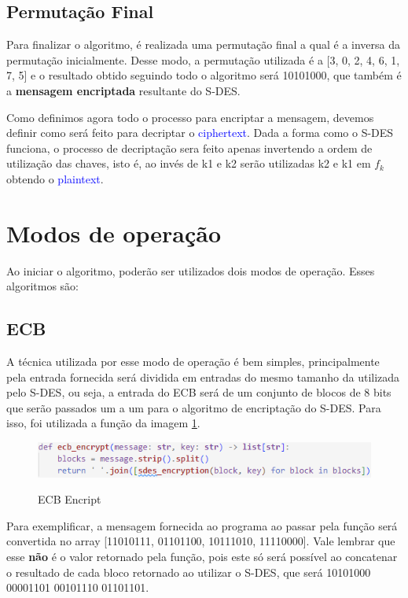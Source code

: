 \documentclass[12pt]{article}
\newcommand{\blue}[1]{\textcolor{blue}{#1}}
\begin{document}
\newpage
\subsection{Permutação Final}

Para finalizar o algoritmo, é realizada uma permutação final a qual é a inversa da permutação inicialmente. Desse modo, a permutação utilizada é a [3, 0, 2, 4, 6, 1, 7, 5] e o resultado obtido seguindo todo o algoritmo será 10101000, que também é a \textbf{mensagem encriptada} resultante do S-DES.

Como definimos agora todo o processo para encriptar a mensagem, devemos definir como será feito para decriptar o \blue{ciphertext}. Dada a forma como o S-DES funciona, o processo de decriptação sera feito apenas invertendo a ordem de utilização das chaves, isto é, ao invés de k1 e k2 serão utilizadas k2 e k1 em $f_{k}$ obtendo o \blue{plaintext}. 
\newpage

\section{Modos de operação}
Ao iniciar o algoritmo, poderão ser utilizados dois modos de operação. Esses algoritmos são:

\subsection{ECB}
A técnica utilizada por esse modo de operação é bem simples, principalmente pela entrada fornecida será dividida em entradas do mesmo tamanho da utilizada pelo S-DES, ou seja, a entrada do ECB será de um conjunto de blocos de 8 bits que serão passados um a um para o algoritmo de encriptação do S-DES. Para isso, foi utilizada a função da imagem \ref{fig:ECB_Encript}.

\begin{figure}[h]
    \caption{ECB Encript}  
    \centering
    \includegraphics[width = 0.8\linewidth]{Imagens/ECB_Encrypt.png}  
    \label{fig:ECB_Encript}
\end{figure}

Para exemplificar, a mensagem fornecida ao programa ao passar pela função será convertida no array [11010111, 01101100, 10111010, 11110000]. Vale lembrar que esse \textbf{não} é o valor retornado pela função, pois este só será possível ao concatenar o resultado de cada bloco retornado ao utilizar o S-DES, que será 10101000 00001101 00101110 01101101.
\end{document}
